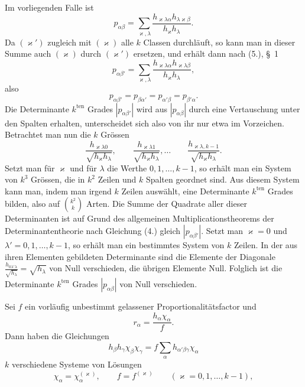 \documentclass[11pt]{article}
\begin{document}
Im vorliegenden Falle ist
\[
p_{\alpha\beta}=\sum_{\varkappa,\lambda}\frac{h_{\varkappa\lambda\alpha}h_{\lambda\varkappa\beta}}{h_\varkappa h_\lambda}.
\]
Da $(\varkappa')$ zugleich mit $(\varkappa)$ alle $k$ Classen durchläuft, so kann man in dieser Summe auch $(\varkappa)$ durch $(\varkappa')$ ersetzen, und erhält dann nach (5.), \S~1
\begin{equation*}\tag{4.}
p_{\alpha\beta'}=\sum_{\varkappa,\lambda}\frac{h_{\varkappa\lambda\alpha}h_{\varkappa\lambda\beta}}{h_\varkappa h_\lambda},
\end{equation*}
also
\begin{equation*}\tag{5.}
p_{\alpha\beta'}=p_{\beta\alpha'}=p_{\alpha'\beta}=p_{\beta'\alpha}.
\end{equation*}
Die Determinante $k^{\text{ten}}$ Grades $|p_{\alpha\beta'}|$ wird aus $|p_{\alpha\beta}|$ durch eine Vertauschung unter den Spalten erhalten, unterscheidet sich also von ihr nur etwa im Vorzeichen. Betrachtet man nun die $k$ Grössen
\[
\frac{h_{\varkappa\lambda0}}{\sqrt{h_\varkappa h_\lambda}},\qquad
\frac{h_{\varkappa\lambda1}}{\sqrt{h_\varkappa h_\lambda}},\ldots\qquad
\frac{h_{\varkappa\lambda,k-1}}{\sqrt{h_\varkappa h_\lambda}}.
\]
Setzt man für $\varkappa$ und für $\lambda$ die Werthe $0,1,\ldots,k-1$, so erhält man ein System von $k^3$ Grössen, die in $k^2$ Zeilen und $k$ Spalten geordnet sind. Aus diesem System kann man, indem man irgend $k$ Zeilen auswählt, eine Determinante $k^{\text{ten}}$ Grades bilden, also auf $\binom{k^2}{k}$ Arten. Die Summe der Quadrate aller dieser Determinanten ist auf Grund des allgemeinen Multiplicationstheorems der Determinantentheorie nach Gleichung (4.) gleich $|p_{\alpha\beta'}|$. Setzt man $\varkappa=0$ und $\lambda'=0,1,\ldots,k-1$, so erhält man ein bestimmtes System von $k$ Zeilen. In der aus ihren Elementen gebildeten Determinante sind die Elemente der Diagonale $\frac{h_{0\lambda'\lambda}}{\sqrt{h_\lambda}}=\sqrt{h_\lambda}$ von Null verschieden, die übrigen Elemente Null. Folglich ist die Determinante $k^{\text{ten}}$ Grades $|p_{\alpha\beta}|$ von Null verschieden.

Sei $f$ ein vorläufig unbestimmt gelassener Proportionalitätsfactor und
\[
r_\alpha=\frac{h_\alpha\chi_\alpha}{f}.
\]
Dann haben die Gleichungen
\begin{equation*}\tag{6.}
h_\beta h_\gamma\chi_\beta\chi_\gamma=f\sum_\alpha h_{\alpha'\beta\gamma}\chi_\alpha
\end{equation*}
$k$ verschiedene Systeme von Lösungen
\begin{equation*}\tag{7.}
\chi_\alpha=\chi_\alpha^{(\varkappa)},\qquad f=f^{(\varkappa)}\qquad(\varkappa=0,1,\ldots,k-1),
\end{equation*}
\end{document}
